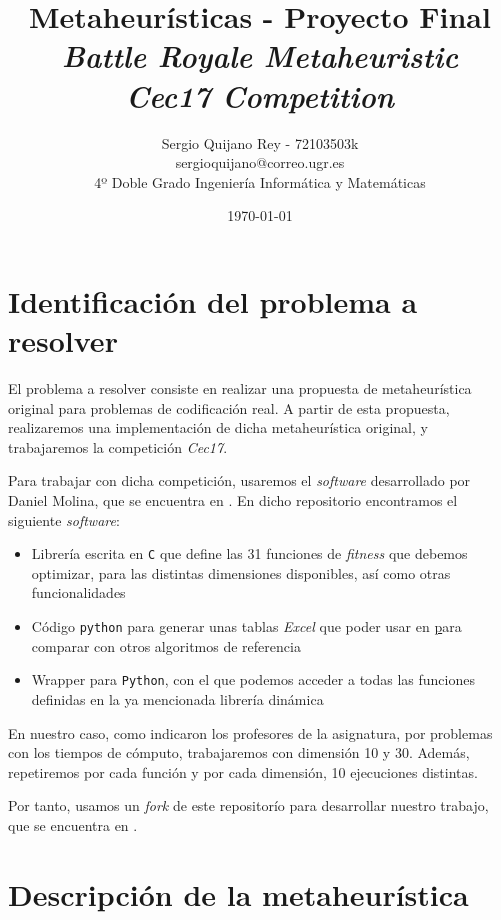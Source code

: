 \documentclass[11pt]{article}
\title{
    {Metaheurísticas - Proyecto Final}\\
    {\emph{Battle Royale Metaheuristic}}\\
    {\emph{Cec17 Competition}}
}
\author{
    {Sergio Quijano Rey - 72103503k}\\
    {sergioquijano@correo.ugr.es} \\
    {4º Doble Grado Ingeniería Informática y Matemáticas}
}
\date{\today}
\begin{document}
\maketitle
\pagebreak

\tableofcontents

\listoffigures

\listoftables

\pagebreak
\section{Identificación del problema a resolver}

El problema a resolver consiste en realizar una propuesta de metaheurística original para problemas de codificación real. A partir de esta propuesta, realizaremos una implementación de dicha metaheurística original, y trabajaremos la competición \emph{Cec17}.

Para trabajar con dicha competición, usaremos el \emph{software} desarrollado por Daniel Molina, que se encuentra en \cite{daniel_repo:online}. En dicho repositorio encontramos el siguiente \emph{software}:

\begin{itemize}
    \item Librería escrita en \lstinline{C} que define las 31 funciones de \emph{fitness} que debemos optimizar, para las distintas dimensiones disponibles, así como otras funcionalidades
    \item Código \lstinline{python} para generar unas tablas \emph{Excel} que poder usar en \href{tacolab.org} para comparar con otros algoritmos de referencia
    \item Wrapper para \lstinline{Python}, con el que podemos acceder a todas las funciones definidas en la ya mencionada librería dinámica
\end{itemize}

En nuestro caso, como indicaron los profesores de la asignatura, por problemas con los tiempos de cómputo, trabajaremos con dimensión 10 y 30. Además, repetiremos por cada función y por cada dimensión, 10 ejecuciones distintas.

Por tanto, usamos un \emph{fork} de este repositorío para desarrollar nuestro trabajo, que se encuentra en \cite{repositorio:online}.

\pagebreak
\section{Descripción de la metaheurística} \label{descripcion}
\end{document}
